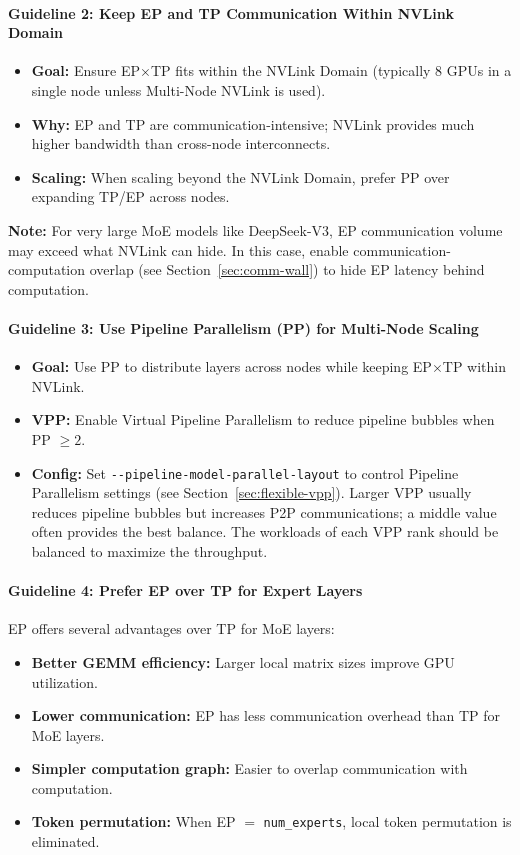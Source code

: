 \documentclass[10pt,logo,copyright]{nvidiatechreport}
\begin{document}
\paragraph*{Guideline 2: Keep EP and TP Communication Within NVLink Domain}
\begin{itemize}
    \item \textbf{Goal:} Ensure EP$\times$TP fits within the NVLink Domain (typically 8 GPUs in a single node unless Multi-Node NVLink is used).
    \item \textbf{Why:} EP and TP are communication-intensive; NVLink provides much higher bandwidth than cross-node interconnects.
    \item \textbf{Scaling:} When scaling beyond the NVLink Domain, prefer PP over expanding TP/EP across nodes.
\end{itemize}

\noindent\textbf{Note:} For very large MoE models like DeepSeek-V3, EP communication volume may exceed what NVLink can hide. In this case, enable communication-computation overlap (see Section~\ref{sec:comm-wall}) to hide EP latency behind computation.

\paragraph*{Guideline 3: Use Pipeline Parallelism (PP) for Multi-Node Scaling}
\begin{itemize}
    \item \textbf{Goal:} Use PP to distribute layers across nodes while keeping EP$\times$TP within NVLink.
    \item \textbf{VPP:} Enable Virtual Pipeline Parallelism to reduce pipeline bubbles when PP $\geq 2$.
    \item \textbf{Config:} Set \texttt{-{}-pipeline-model-parallel-layout} to control Pipeline Parallelism settings (see Section~\ref{sec:flexible-vpp}). Larger VPP usually reduces pipeline bubbles but increases P2P communications; a middle value often provides the best balance. The workloads of each VPP rank should be balanced to maximize the throughput.
\end{itemize}

\paragraph*{Guideline 4: Prefer EP over TP for Expert Layers}
EP offers several advantages over TP for MoE layers:
\begin{itemize}
    \item \textbf{Better GEMM efficiency:} Larger local matrix sizes improve GPU utilization.
    \item \textbf{Lower communication:} EP has less communication overhead than TP for MoE layers.
    \item \textbf{Simpler computation graph:} Easier to overlap communication with computation.
    \item \textbf{Token permutation:} When EP $=$ \texttt{num\_experts}, local token permutation is eliminated.
\end{itemize}
\end{document}
